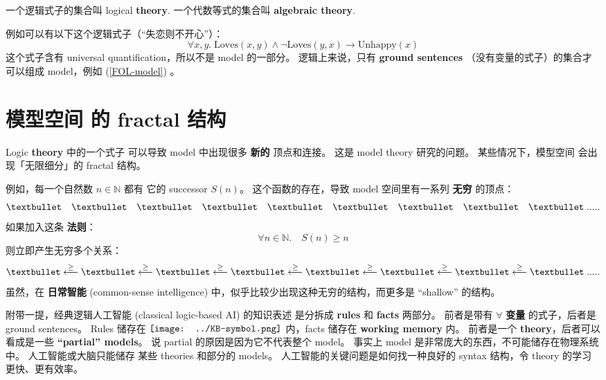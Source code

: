 \documentclass[12pt, orivec]{article}
\newcommand*\KB{\vcenter{\hbox{\texttt{[image: ../KB-symbol.png]}}}}
\begin{document}
一个逻辑式子的集合叫 logical \textbf{theory}.  一个代数等式的集合叫 \textbf{algebraic theory}.

例如可以有以下这个逻辑式子（``失恋则不开心''）：
\begin{equation}
\forall x,y. \; \mbox{Loves}(x,y) \wedge \neg \mbox{Loves}(y,x) \rightarrow \mbox{Unhappy}(x)
\end{equation}
这个式子含有 universal quantification，所以不是 model 的一部分。 逻辑上来说，只有 \textbf{ground sentences} （没有变量的式子）的集合才可以组成 model，例如 (\ref{FOL-model}) 。 

\section{模型空间 的 fractal 结构}

Logic \textbf{theory} 中的一个式子 可以导致 model 中出现很多 \textbf{新的} 顶点和连接。 这是 model theory 研究的问题。  某些情况下，模型空间 会出现「无限细分」的 fractal 结构。 

例如，每一个自然数 $n \in \mathbb{N}$ 都有 它的 successor $S(n)$。 这个函数的存在，导致 model 空间里有一系列 \textbf{无穷} 的顶点：
\begin{equation}
\textbullet \quad \textbullet \quad \textbullet \quad \textbullet \quad \textbullet \quad \textbullet \quad \textbullet \quad \textbullet \quad \textbullet \; .....
\end{equation}
如果加入这条 \textbf{法则}：
\begin{equation}
\forall n \in \mathbb{N}. \quad S(n) \ge n
\end{equation}
则立即产生无穷多个关系：
\begin{equation}
\textbullet \stackrel{\ge}{\longleftarrow} \textbullet \stackrel{\ge}{\longleftarrow} \textbullet \stackrel{\ge}{\longleftarrow} \textbullet \stackrel{\ge}{\longleftarrow} \textbullet \stackrel{\ge}{\longleftarrow} \textbullet \stackrel{\ge}{\longleftarrow} \textbullet \stackrel{\ge}{\longleftarrow} \textbullet \; .....
\end{equation}
虽然，在 \textbf{日常智能} (common-sense intelligence) 中，似乎比较少出现这种无穷的结构，而更多是 ``shallow'' 的结构。 

\footnotesize
附带一提，经典逻辑人工智能 (classical logic-based AI) 的知识表述 是分拆成 \textbf{rules} 和 \textbf{facts} 两部分。 前者是带有 $\forall$ \textbf{变量} 的式子，后者是 ground sentences。  Rules 储存在 $\KB$ 内，facts 储存在 \textbf{working memory} 内。 前者是一个 \textbf{theory}，后者可以看成是一些 \textbf{``partial'' models}。  说 partial 的原因是因为它不代表整个 model。  事实上 model 是非常庞大的东西，不可能储存在物理系统中。  人工智能或大脑只能储存 某些 theories 和部分的 models。  人工智能的关键问题是如何找一种良好的 syntax 结构，令 theory 的学习更快、更有效率。 
\normalsize
\end{document}
